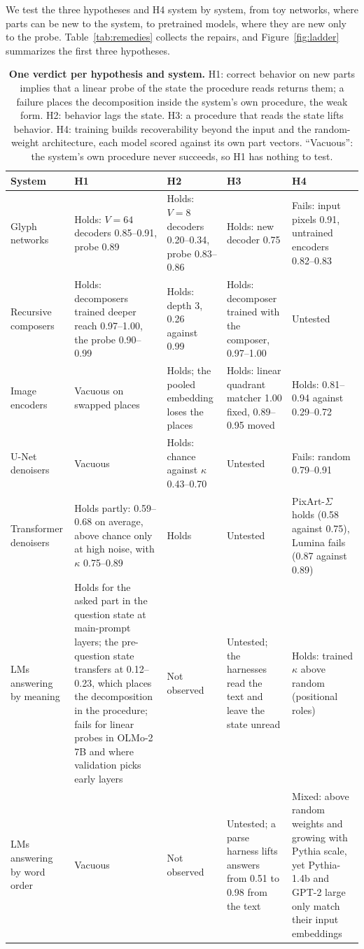 We test the three hypotheses and H4 system by system, from toy networks, where parts can be new to the system, to pretrained models, where they are new only to the probe. Table~\ref{tab:remedies} collects the repairs, and Figure~\ref{fig:ladder} summarizes the first three hypotheses.

\begin{table}[t]
  \caption{\textbf{One verdict per hypothesis and system.} H1: correct behavior on new parts implies that a linear probe of the state the procedure reads returns them; a failure places the decomposition inside the system's own procedure, the weak form. H2: behavior lags the state. H3: a procedure that reads the state lifts behavior. H4: training builds recoverability beyond the input and the random-weight architecture, each model scored against its own part vectors. ``Vacuous'': the system's own procedure never succeeds, so H1 has nothing to test.}
  \label{tab:verdicts}
  \centering\footnotesize
  \begin{tabularx}{\textwidth}{@{}lYYYY@{}}
    \toprule
    System & H1 & H2 & H3 & H4 \\
    \midrule
    Glyph networks & Holds: $V = 64$ decoders 0.85--0.91, probe 0.89 & Holds: $V = 8$ decoders 0.20--0.34, probe 0.83--0.86 & Holds: new decoder 0.75 & Fails: input pixels 0.91, untrained encoders 0.82--0.83 \\
    Recursive composers & Holds: decomposers trained deeper reach 0.97--1.00, the probe 0.90--0.99 & Holds: depth 3, 0.26 against 0.99 & Holds: decomposer trained with the composer, 0.97--1.00 & Untested \\
    Image encoders & Vacuous on swapped places & Holds; the pooled embedding loses the places & Holds: linear quadrant matcher 1.00 fixed, 0.89--0.95 moved & Holds: 0.81--0.94 against 0.29--0.72 \\
    U-Net denoisers & Vacuous & Holds: chance against $\kappa$ 0.43--0.70 & Untested & Fails: random 0.79--0.91 \\
    Transformer denoisers & Holds partly: 0.59--0.68 on average, above chance only at high noise, with $\kappa$ 0.75--0.89 & Holds & Untested & PixArt-$\Sigma$ holds (0.58 against 0.75), Lumina fails (0.87 against 0.89) \\
    LMs answering by meaning & Holds for the asked part in the question state at main-prompt layers; the pre-question state transfers at 0.12--0.23, which places the decomposition in the procedure; fails for linear probes in OLMo-2 7B and where validation picks early layers & Not observed & Untested; the harnesses read the text and leave the state unread & Holds: trained $\kappa$ above random (positional roles) \\
    LMs answering by word order & Vacuous & Not observed & Untested; a parse harness lifts answers from 0.51 to 0.98 from the text & Mixed: above random weights and growing with Pythia scale, yet Pythia-1.4b and GPT-2 large only match their input embeddings \\
    \bottomrule
  \end{tabularx}
\end{table}


